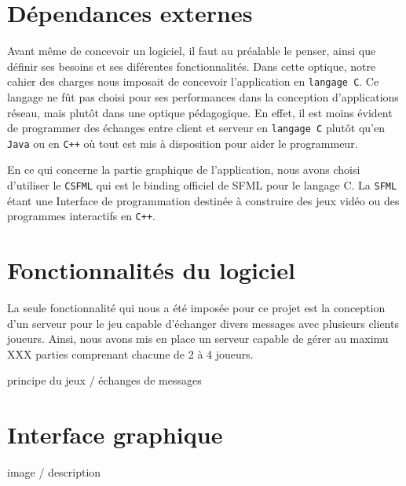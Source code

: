 \section*{Dépendances externes}

	Avant même de concevoir un logiciel, il faut au préalable le penser, ainsi que définir ses besoins et ses diférentes fonctionnalités. Dans cette optique, notre cahier des charges nous imposait de concevoir l'application en \texttt{langage C}. Ce langage ne fût pas choisi pour ses performances dans la conception d'applications réseau, mais plutôt dans une optique pédagogique. En effet, il est moins évident de programmer des échanges entre client et serveur en \texttt{langage C} plutôt qu'en \texttt{Java} ou en \texttt{C++} où tout est mis à disposition pour aider le programmeur.

\vspace{0.5cm}

	En ce qui concerne la partie graphique de l'application, nous avons choisi d'utiliser le \texttt{CSFML} qui est le binding officiel de SFML pour le langage C. La \texttt{SFML} étant une Interface de programmation destinée à construire des jeux vidéo ou des programmes interactifs en \texttt{C++}.

\section*{Fonctionnalités du logiciel}

	La seule fonctionnalité qui nous a été imposée pour ce projet est la conception d'un serveur pour le jeu capable d'échanger divers messages avec plusieurs clients joueurs. Ainsi, nous avons mis en place un serveur capable de gérer au maximu XXX parties comprenant chacune de 2 à 4 joueurs. 

			principe du jeux / échanges de messages

\section*{Interface graphique}
			image / description

